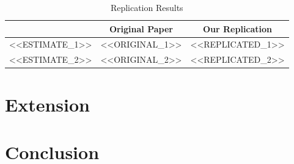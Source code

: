 \documentclass[12pt]{article}
\begin{document}

\begin{table}[h!]
\centering
\caption{Replication Results}
\label{tab:replication}
\begin{tabular}{lcc}
\toprule
 & Original Paper & Our Replication \\
\midrule
<<ESTIMATE_1>> & <<ORIGINAL_1>> & <<REPLICATED_1>> \\
<<ESTIMATE_2>> & <<ORIGINAL_2>> & <<REPLICATED_2>> \\
\bottomrule
\end{tabular}
\end{table}

\section{Extension}


\section{Conclusion}




\end{document}

